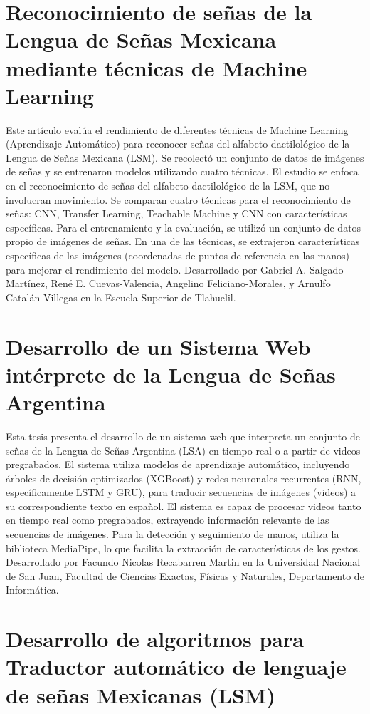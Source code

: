 \section{Reconocimiento de señas de la Lengua de Señas Mexicana mediante técnicas de Machine Learning \cite{ref28}}

Este artículo evalúa el rendimiento de diferentes técnicas de Machine Learning (Aprendizaje Automático) para reconocer señas del alfabeto dactilológico de la Lengua de Señas Mexicana (LSM).  Se recolectó un conjunto de datos de imágenes de señas y se entrenaron modelos utilizando cuatro técnicas.  El estudio se enfoca en el reconocimiento de señas del alfabeto dactilológico de la LSM, que no involucran movimiento.  Se comparan cuatro técnicas para el reconocimiento de señas: CNN, Transfer Learning, Teachable Machine y CNN con características específicas. Para el entrenamiento y la evaluación, se utilizó un conjunto de datos propio de imágenes de señas.  En una de las técnicas, se extrajeron características específicas de las imágenes (coordenadas de puntos de referencia en las manos) para mejorar el rendimiento del modelo. Desarrollado por Gabriel A. Salgado-Martínez, René E. Cuevas-Valencia, Angelino Feliciano-Morales, y Arnulfo Catalán-Villegas en la Escuela Superior de Tlahuelil.

\section{Desarrollo de un Sistema Web intérprete de la Lengua de Señas Argentina \cite{ref29}}

Esta tesis presenta el desarrollo de un sistema web que interpreta un conjunto de señas de la Lengua de Señas Argentina (LSA) en tiempo real o a partir de videos pregrabados. El sistema utiliza modelos de aprendizaje automático, incluyendo árboles de decisión optimizados (XGBoost) y redes neuronales recurrentes (RNN, específicamente LSTM y GRU), para traducir secuencias de imágenes (videos) a su correspondiente texto en español.  El sistema es capaz de procesar videos tanto en tiempo real como pregrabados, extrayendo información relevante de las secuencias de imágenes.  Para la detección y seguimiento de manos, utiliza la biblioteca MediaPipe, lo que facilita la extracción de características de los gestos. Desarrollado por Facundo Nicolas Recabarren Martin en la Universidad Nacional de San Juan, Facultad de Ciencias Exactas, Físicas y Naturales, Departamento de Informática.

\section{Desarrollo de algoritmos para Traductor automático de lenguaje de señas Mexicanas (LSM) \cite{ref30}}

